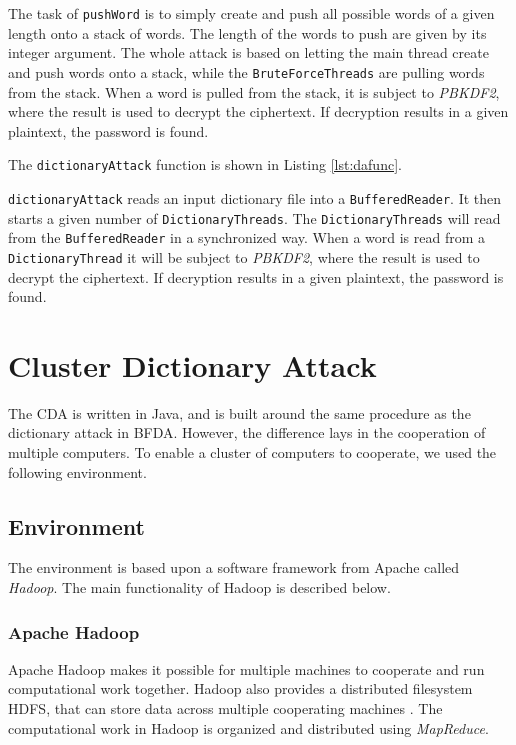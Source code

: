 \documentclass[pdftex,english,10pt,b5paper,twoside]{book}
\begin{document}
The task of \texttt{pushWord} is to simply create and push all possible words
of a given length onto a stack of words. The length of the words to push are
given by its integer argument. The whole attack is based on letting the main
thread create and push words onto a stack, while the \texttt{BruteForceThreads} are
pulling words from the stack. When a word is pulled from the stack, it is
subject to \emph{PBKDF2}, where the result is used to decrypt the ciphertext. If
decryption results in a given plaintext, the password is found.

The \texttt{dictionaryAttack} function is shown in Listing \ref{lst:dafunc}.



\texttt{dictionaryAttack} reads an input dictionary file into a
\texttt{BufferedReader}. It then starts a given number of
\texttt{DictionaryThreads}. The \texttt{DictionaryThreads} will read from the
\texttt{BufferedReader} in a synchronized way. When a word is read from a
\texttt{DictionaryThread} it will be subject to \emph{PBKDF2}, where the result is
used to decrypt the ciphertext. If decryption results in a given plaintext, the
password is found.

\section{Cluster Dictionary Attack}

The \ac{CDA} is written in Java, and is built around the same procedure as the
dictionary attack in \ac{BFDA}. However, the difference lays in the cooperation
of multiple computers. To enable a cluster of computers to cooperate, we used
the following environment.

\subsection{Environment}

The environment is based upon a software framework from Apache called
\emph{Hadoop}. The main functionality of Hadoop is described below.

\subsubsection{Apache Hadoop}

Apache Hadoop makes it possible for multiple machines to cooperate
and run computational work together. Hadoop also provides a distributed filesystem
\ac{HDFS}, that can store data across multiple cooperating machines \cite{hadoop}. The
computational work in Hadoop is organized and distributed using \emph{MapReduce}.
\end{document}
